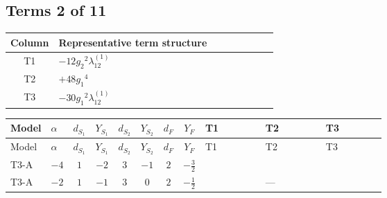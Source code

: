 \documentclass[8pt]{article}
\begin{document}
\begin{landscape}
\subsection*{Terms 2 of 11}
\begin{center}
\begin{tabular}{@{}c >{\raggedright\arraybackslash}p{0.82\linewidth}@{}}
\toprule
Column & Representative term structure \\
\midrule
T1 & \(\displaystyle -12 {g_2}^2 {\lambda_{12}^{(1)}}\) \\
\midrule
T2 & \(\displaystyle +48 {g_1}^4\) \\
\midrule
T3 & \(\displaystyle -30 {g_1}^2 {\lambda_{12}^{(1)}}\) \\
\midrule
\bottomrule
\end{tabular}
\end{center}
\smallskip
\tiny
\begin{longtable}{@{}llcccccc >{\raggedright\arraybackslash}p{0.21\linewidth} >{\raggedright\arraybackslash}p{0.21\linewidth} >{\raggedright\arraybackslash}p{0.21\linewidth}@{}}
\toprule
Model & $\alpha$ & $d_{S_1}$ & $Y_{S_1}$ & $d_{S_2}$ & $Y_{S_2}$ & $d_F$ & $Y_F$ & T1 & T2 & T3 \\
\midrule
\endfirsthead
\toprule
Model & $\alpha$ & $d_{S_1}$ & $Y_{S_1}$ & $d_{S_2}$ & $Y_{S_2}$ & $d_F$ & $Y_F$ & T1 & T2 & T3 \\
\midrule
\endhead
T3-A & $-4$ & $1$ & $-2$ & $3$ & $-1$ & $2$ & $-\frac{3}{2}$ & \scriptsize\adjustbox{max width=\linewidth}{$\begin{gathered} -12 {g_2}^2 {\lambda_{12}^{(1)}}\end{gathered}$} & \scriptsize\adjustbox{max width=\linewidth}{$\begin{gathered} +48 {g_1}^4\end{gathered}$} & \scriptsize\adjustbox{max width=\linewidth}{$\begin{gathered} -30 {g_1}^2 {\lambda_{12}^{(1)}}\end{gathered}$} \\
\midrule
T3-A & $-2$ & $1$ & $-1$ & $3$ & $0$ & $2$ & $-\frac{1}{2}$ & \scriptsize\adjustbox{max width=\linewidth}{$\begin{gathered} -12 {g_2}^2 {\lambda_{12}^{(1)}}\end{gathered}$} & --- & \scriptsize\adjustbox{max width=\linewidth}{$\begin{gathered} -6 {g_1}^2 {\lambda_{12}^{(1)}}\end{gathered}$} \\

\end{longtable}
\end{landscape}
\end{document}
